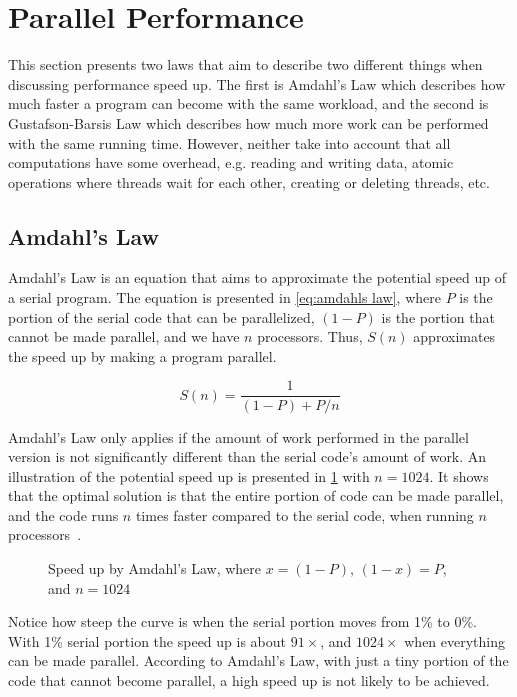 \section{Parallel Performance}
\label{sec:parallel performance}

This section presents two laws that aim to describe two different things when discussing performance speed up.
The first is Amdahl's Law which describes how much faster a program can become with the same workload, and the second is Gustafson-Barsis Law which describes how much more work can be performed with the same running time.
However, neither take into account that all computations have some overhead, e.g. reading and writing data, atomic operations where threads wait for each other, creating or deleting threads, etc.

\subsection{Amdahl's Law}
\label{sec:amdahls law}

Amdahl's Law is an equation that aims to approximate the potential speed up of a serial program.
The equation is presented in \cref{eq:amdahls law}, where $P$ is the portion of the serial code that can be parallelized, $(1-P)$ is the portion that cannot be made parallel, and we have $n$ processors.
Thus, $S(n)$ approximates the speed up by making a program parallel.

\begin{equation}
  \label{eq:amdahls law}
  S(n) = \frac{1}{(1-P) + P/n}
\end{equation}

Amdahl's Law only applies if the amount of work performed in the parallel version is not significantly different than the serial code's amount of work.
An illustration of the potential speed up is presented in \cref{fig:amdahls law} with $n=1024$.
It shows that the optimal solution is that the entire portion of code can be made parallel, and the code runs $n$ times faster compared to the serial code, when running $n$ processors~\cite{farber2011cuda}.

\begin{figure}[htb]
  \centering
  
  \caption{Speed up by Amdahl's Law, where $x=(1-P)$, $(1-x)=P$, and $n=1024$}
  \label{fig:amdahls law}
\end{figure}

Notice how steep the curve is when the serial portion moves from 1\% to 0\%.
With 1\% serial portion the speed up is about $91\times$, and $1024\times$ when everything can be made parallel.
According to Amdahl's Law, with just a tiny portion of the code that cannot become parallel, a high speed up is not likely to be achieved.

